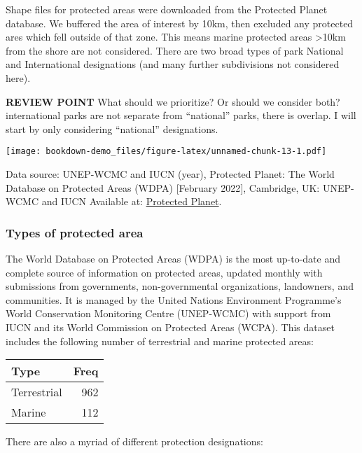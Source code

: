 \documentclass[
]{book}
\begin{document}
Shape files for protected areas were downloaded from the Protected Planet database. We buffered the area of interest by 10km, then excluded any protected ares which fell outside of that zone. This means marine protected areas \textgreater10km from the shore are not considered. There are two broad types of park National and International designations (and many further subdivisions not considered here).

\textbf{REVIEW POINT} What should we prioritize? Or should we consider both? international parks are not separate from ``national'' parks, there is overlap. I will start by only considering ``national'' designations.

\texttt{[image: bookdown-demo\_files/figure-latex/unnamed-chunk-13-1.pdf]}

Data source: UNEP-WCMC and IUCN (year), Protected Planet: The World Database on Protected Areas (WDPA) {[}February 2022{]}, Cambridge, UK: UNEP-WCMC and IUCN Available at: \href{www.protectedplanet.net}{Protected Planet}.

\hypertarget{types-of-protected-area}{%
\subsubsection{Types of protected area}\label{types-of-protected-area}}

The World Database on Protected Areas (WDPA) is the most up-to-date and complete source of information on protected areas, updated monthly with submissions from governments, non-governmental organizations, landowners, and communities. It is managed by the United Nations Environment Programme's World Conservation Monitoring Centre (UNEP-WCMC) with support from IUCN and its World Commission on Protected Areas (WCPA). This dataset includes the following number of terrestrial and marine protected areas:

\begin{table}
\centering
\begin{tabular}[t]{l|r}
\hline
Type & Freq\\
\hline
Terrestrial & 962\\
\hline
Marine & 112\\
\hline
\end{tabular}
\end{table}

There are also a myriad of different protection designations:
\end{document}
